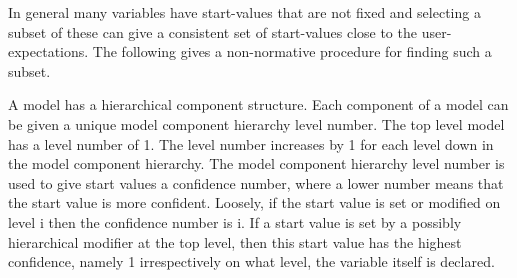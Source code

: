 In general many variables have start-values that are not fixed and selecting a subset of these can give a consistent set of start-values close to the user-expectations.
The following gives a non-normative procedure for finding such a subset.

\begin{nonnormative}
A model has a hierarchical component structure. Each component
of a model can be given a unique model component hierarchy level number.
The top level model has a level number of 1. The level number increases
by 1 for each level down in the model component hierarchy. The model
component hierarchy level number is used to give start values a
confidence number, where a lower number means that the start value is
more confident. Loosely, if the start value is set or modified on level
i then the confidence number is i. If a start value is set by a possibly
hierarchical modifier at the top level, then this start value has the
highest confidence, namely 1 irrespectively on what level, the variable
itself is declared.
\end{nonnormative}
